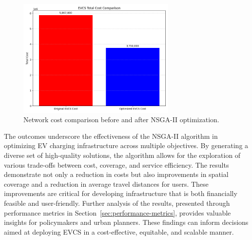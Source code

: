 \clearpage

\begin{figure}[h!]
\centering
\includegraphics[width=0.7\textwidth]{../Figures/plot_EVCS_cost.png}
\caption{Network cost comparison before and after NSGA-II optimization.}
\label{fig:network_cost_comparison}
\end{figure}

The outcomes underscore the effectiveness of the NSGA-II algorithm in optimizing EV charging infrastructure across multiple objectives. By generating a diverse set of high-quality solutions, the algorithm allows for the exploration of various trade-offs between cost, coverage, and service efficiency. The results demonstrate not only a reduction in costs but also improvements in spatial coverage and a reduction in average travel distances for users. These improvements are critical for developing infrastructure that is both financially feasible and user-friendly. Further analysis of the results, presented through performance metrics in Section~\ref{sec:performance-metrics}, provides valuable insights for policymakers and urban planners. These findings can inform decisions aimed at deploying EVCS in a cost-effective, equitable, and scalable manner.


